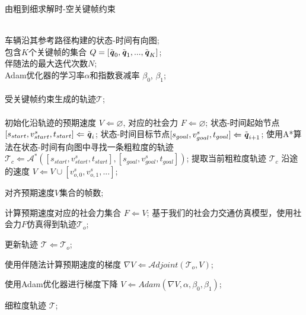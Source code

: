 \begin{algorithm}[!tbh]
\setlength{\belowdisplayskip}{-0.25cm}
\caption{由粗到细求解时-空关键帧约束}
\label{alg:keyframe_optimization}
\begin{algorithmic}[1]

\REQUIRE ~~\\ %
    车辆沿其参考路径构建的状态-时间有向图; \\
    包含$K$个关键帧的集合 $Q= [\Tilde{\textbf{\emph{q}}}_0, \Tilde{\textbf{\emph{q}}}_1, ..., \Tilde{\textbf{\emph{q}}}_K]$; \\
    伴随法的最大迭代次数$N$; \\
    Adam优化器的学习率$\alpha$和指数衰减率 $\beta_0$, $\beta_1$; \\
\ENSURE ~~\\ %
    受关键帧约束生成的轨迹$\mathcal{T}$; \\~\\

\STATE 初始化沿轨迹的预期速度 $V \Leftarrow \varnothing$, 对应的社会力 $F \Leftarrow \varnothing$; 
    \STATE 状态-时间起始节点$[s_{start}, v^s_{start}, t_{start}] \Leftarrow \Tilde{\textbf{\emph{q}}}_i$;
    \STATE 状态-时间目标节点$[s_{goal}, v^s_{goal}, t_{goal}] \Leftarrow \Tilde{\textbf{\emph{q}}}_{i+1}$;
    \STATE 使用A*算法在状态-时间有向图中寻找一条粗粒度的轨迹 $\mathcal{T}_c \Leftarrow \mathcal{A}^*([s_{start}, v^s_{start}, t_{start}], [s_{goal}, v^s_{goal}, t_{goal}])$;
    \STATE 提取当前粗粒度轨迹 $\mathcal{T}_c$ 沿途的速度 $V \Leftarrow V\cup[v^s_{o,0}, v^s_{o,1},...]$;
\ENDFOR

\STATE 对齐预期速度$V$集合的帧数;

    \STATE 计算预期速度对应的社会力集合 $F \Leftarrow V$;
    \STATE 基于我们的社会力交通仿真模型，使用社会力$F$仿真得到轨迹$\mathcal{T}_o$;
    
        \STATE 更新轨迹 $\mathcal{T} \Leftarrow \mathcal{T}_o$;
    \ENDIF
    
    \STATE 使用伴随法计算预期速度的梯度 $\nabla{V} \Leftarrow \mathcal{A}djoint(\mathcal{T}_o, V)$;
    
    \STATE 使用Adam优化器进行梯度下降 $V \Leftarrow Adam(\nabla{V}, \alpha,\beta_0,\beta_1)$;
\ENDFOR

\RETURN 细粒度轨迹 $\mathcal{T}$;

\end{algorithmic}
\end{algorithm}


